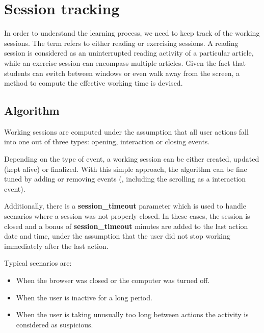 \section{Session tracking}\label{p02:session_tracking}

In order to understand the learning process, we need to keep track of the working sessions. The term refers to either reading or exercising sessions. A reading session is considered as an uninterrupted reading activity of a particular article, while an exercise session can encompass multiple articles. Given the fact that students can switch between windows or even walk away from the screen, a method to compute the effective working time is devised. 

\subsection{Algorithm}
Working sessions are computed under the assumption that all user actions fall into one out of three types: opening, interaction or closing events.

Depending on the type of event, a working session can be either created, updated (kept alive) or finalized. With this simple approach, the algorithm can be fine tuned by adding or removing events (\eg, including the scrolling as a interaction event).

Additionally, there is a \textbf{session\_timeout} parameter which is used to handle scenarios where a session was not properly closed. In these cases, the session is closed and a bonus of \textbf{session\_timeout} minutes are added to the last action date and time, under the assumption that the user did not stop working immediately after the last action.

Typical scenarios are:

\begin{itemize}
	\item When the browser was closed or the computer was turned off.
	
	\item When the user is inactive for a long period.
	
	\item When the user is taking unusually too long between actions the activity is considered as suspicious.
\end{itemize}


